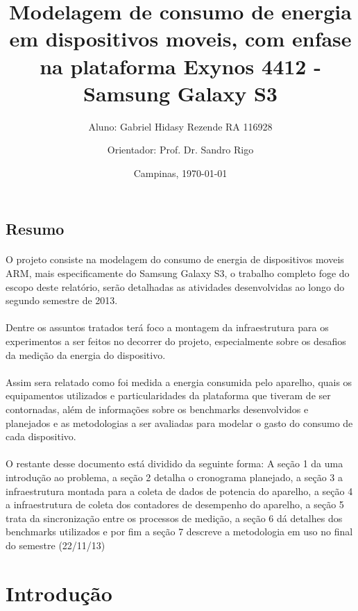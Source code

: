 \documentclass[11pt,a4paper,titlepage]{article}
\title{Modelagem de consumo de energia em dispositivos moveis, com enfase na plataforma Exynos 4412 - Samsung Galaxy S3}
\author{Aluno: Gabriel Hidasy Rezende RA 116928 \and Orientador: Prof. Dr. Sandro Rigo}
\date{Campinas, \today}
\begin{document}
\maketitle

\tableofcontents
\newpage

\begin{center}
\section*{Resumo}
\end{center}
\paragraph{} O projeto consiste na modelagem do consumo de energia de dispositivos moveis ARM, mais especificamente do Samsung Galaxy S3, o trabalho completo foge do escopo deste relatório, serão detalhadas as atividades desenvolvidas ao longo do segundo semestre de 2013.
\paragraph{} Dentre os assuntos tratados terá foco a montagem da infraestrutura para os experimentos a ser feitos no decorrer do projeto, especialmente sobre os desafios da medição da energia do dispositivo.
\paragraph{} Assim sera relatado como foi medida a energia consumida pelo aparelho, quais os equipamentos utilizados e particularidades da plataforma que tiveram de ser contornadas, além de informações sobre os benchmarks desenvolvidos e planejados e as metodologias a ser avaliadas para modelar o gasto do consumo de cada dispositivo.
\paragraph{} O restante desse documento está dividido da seguinte forma: A seção 1 da uma introdução ao problema, a seção 2 detalha o cronograma planejado, a seção 3 a infraestrutura montada para a coleta de dados de potencia do aparelho, a seção 4 a infraestrutura de coleta dos contadores de desempenho do aparelho, a seção 5 trata da sincronização entre os processos de medição, a seção 6 dá detalhes dos benchmarks utilizados e por fim a seção 7 descreve a metodologia em uso no final do semestre (22/11/13)
\newpage
\section{Introdução}
\end{document}
